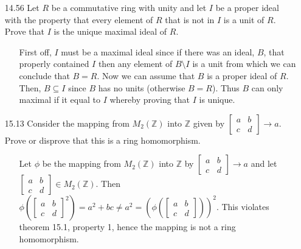 \documentclass[12pt]{article}
\begin{document}
\begin{enumerate}
\item[14.56] Let $R$ be a commutative ring with unity and let $I$ be a proper ideal with the
property that every element of $R$ that is not in $I$ is a unit of $R$. Prove that $I$ is the
unique maximal ideal of $R$.
\begin{enumerate}
\item[] First off, $I$ must be a maximal ideal since if there was an ideal, $B$, that properly contained
$I$ then any element of $B\setminus I$ is a unit from which we can conclude that $B = R$. Now we can assume
that $B$ is a proper ideal of $R$. Then, $B \subseteq I$ since $B$ has no units (otherwise $B = R$). Thus
$B$ can only maximal if it equal to $I$ whereby proving that $I$ is unique. 
\end{enumerate}

\item[15.13] Consider the mapping from $M_2(\mathbb{Z})$ into $\mathbb{Z}$ given by
$\left[ \begin{array}{cc} a & b \\ c & d \end{array} \right] \rightarrow a$. Prove
or disprove that this is a ring homomorphism.
\begin{enumerate}
\item[] Let $\phi$ be the mapping from $M_2(\mathbb{Z})$ into $\mathbb{Z}$ by
$\left[ \begin{array}{cc} a & b \\ c & d \end{array} \right] \rightarrow a$ and let 
$\left[ \begin{array}{cc} a & b \\ c & d \end{array} \right] \in M_2(\mathbb{Z})$. Then 
$\phi(\left[ \begin{array}{cc} a & b \\ c & d \end{array} \right]^2) = a^2 + bc \neq a^2 = 
(\phi(\left[ \begin{array}{cc} a & b \\ c & d \end{array} \right]))^2$. This violates
theorem 15.1, property 1, hence the mapping is not a ring homomorphism.
\end{enumerate}


\end{enumerate}
\end{document}
